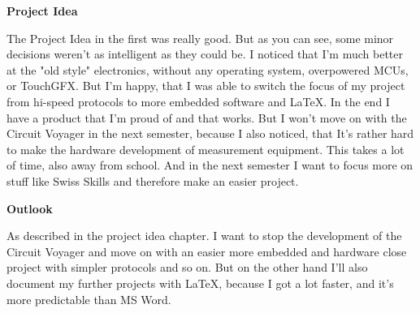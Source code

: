 \newpage
\textbf{Project Idea}

The Project Idea in the first was really good. But as you can see, some minor decisions weren't as intelligent as they could be. I noticed that I'm much better at the "old style" electronics, without any operating system, overpowered MCUs, or TouchGFX. But I'm happy, that I was able to switch the focus of my project from hi-speed protocols to more embedded software and LaTeX. In the end I have a product that I'm proud of and that works. But I won't move on with the Circuit Voyager in the next semester, because I also noticed, that It's rather hard to make the hardware development of measurement equipment. This takes a lot of time, also away from school. And in the next semester I want to focus more on stuff like Swiss Skills and therefore make an easier project.

\vspace{5mm}
\textbf{Outlook}

As described in the project idea chapter. I want to stop the development of the Circuit Voyager and move on with an easier more embedded and hardware close project with simpler protocols and so on. But on the other hand I'll also document my further projects with LaTeX, because I got a lot faster, and it's more predictable than MS Word.